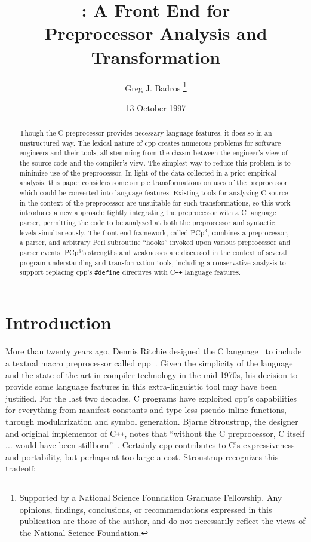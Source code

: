 \documentclass{article}
\title{\pcp{}: A \C{} Front End for \\ Preprocessor Analysis and Transformation}
\author{Greg J. Badros%
  \thanks{Supported by a National Science Foundation
    Graduate Fellowship. Any opinions, findings, conclusions, or
    recommendations expressed in this publication are those of the
    author, and do not necessarily reflect the views of the National
    Science Foundation.}
  \\  \email{gjb@cs.washington.edu}}
\date{13 October 1997}
\newcommand{\pcp}{\mbox{\textsf{PCp}$^3$}}
\newcommand{\Cpp}{\mbox{\textsf{cpp}}}
\newcommand{\CPP}{\mbox{\textsf{C\texttt{++}}}}
\newcommand{\Perl}{\mbox{\textsf{Perl}}}
\newcommand{\C}{\mbox{\textsf{C}}}
\newcommand{\ppd}[1]{\texttt{\##1}}
\begin{document}
\maketitle

\begin{abstract}
\label{sec:abstract}
Though the \C{} preprocessor provides necessary language features, it
does so in an unstructured way.  The lexical nature of \Cpp{} creates
numerous problems for software engineers and their tools, all stemming
from the chasm between the engineer's view of the source code and the
compiler's view.  The simplest way to reduce this problem is to minimize
use of the preprocessor.  In light of the data collected in a prior
empirical analysis, this paper considers some simple transformations on
uses of the preprocessor which could be converted into language
features. Existing tools for analyzing \C{} source in the context of the
preprocessor are unsuitable for such transformations, so this work
introduces a new approach: tightly integrating the preprocessor with a
\C{} language parser, permitting the code to be analyzed at both the
preprocessor and syntactic levels simultaneously.  The front-end
framework, called \pcp{}, combines a preprocessor, a parser, and
arbitrary \Perl{} subroutine ``hooks'' invoked upon various preprocessor
and parser events.  \pcp{}'s strengths
and weaknesses are discussed in the context of several program
understanding and transformation tools, including a conservative
analysis to support replacing \Cpp{}'s \ppd{define} directives with
\CPP{} language features.

\end{abstract}
\bigskip

\section{Introduction}
\label{sec:intro}
More than twenty years ago, Dennis Ritchie designed the \C{}
language~\cite{Kernighan88} to include a textual macro preprocessor
called \Cpp{}~\cite[Ch.~3]{Harbison91}.  Given the simplicity of the
language and the state of the art in compiler technology in the
mid-1970s, his decision to provide some language features in this
extra-linguistic tool may have been justified.  For the last two
decades, \C{} programs have exploited \Cpp{}'s capabilities for
everything from manifest constants and type less pseudo-inline
functions, through modularization and symbol generation.  Bjarne
Stroustrup, the designer and original implementor of \CPP{}, notes that
``without the \C{} preprocessor, \C{} itself $\ldots$ would have been
stillborn''~\cite[p.~119]{Stroustrup94}.  Certainly \Cpp{}
contributes to \C{}'s expressiveness and portability, but
perhaps at too large a cost.  Stroustrup recognizes this tradeoff:
\end{document}
